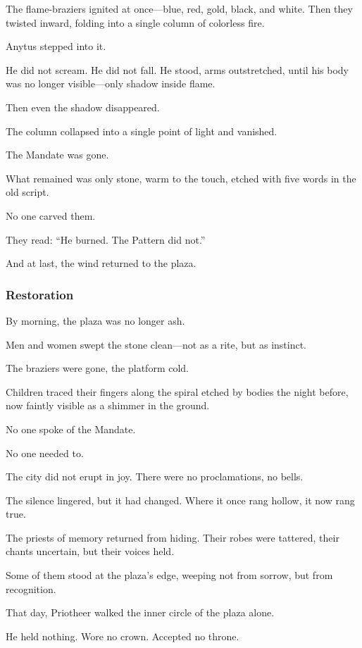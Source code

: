 \documentclass[12pt]{article}
\begin{document}
The flame-braziers ignited at once—blue, red, gold, black, and white. Then they twisted inward, folding into a single column of colorless fire.

Anytus stepped into it.

He did not scream. He did not fall. He stood, arms outstretched, until his body was no longer visible—only shadow inside flame.

Then even the shadow disappeared.

The column collapsed into a single point of light and vanished.

The Mandate was gone.

What remained was only stone, warm to the touch, etched with five words in the old script.

No one carved them.

They read: “He burned. The Pattern did not.”

And at last, the wind returned to the plaza.

\dotfill

\subsubsection{Restoration}

By morning, the plaza was no longer ash.

Men and women swept the stone clean—not as a rite, but as instinct. 

The braziers were gone, the platform cold. 

Children traced their fingers along the spiral etched by bodies the night before, now faintly visible as a shimmer in the ground. 

No one spoke of the Mandate. 

No one needed to.

The city did not erupt in joy. There were no proclamations, no bells. 

The silence lingered, but it had changed. Where it once rang hollow, it now rang true.

The priests of memory returned from hiding. Their robes were tattered, their chants uncertain, but their voices held. 

Some of them stood at the plaza’s edge, weeping not from sorrow, but from recognition.

That day, Priotheer walked the inner circle of the plaza alone.

He held nothing. Wore no crown. Accepted no throne.
\end{document}
